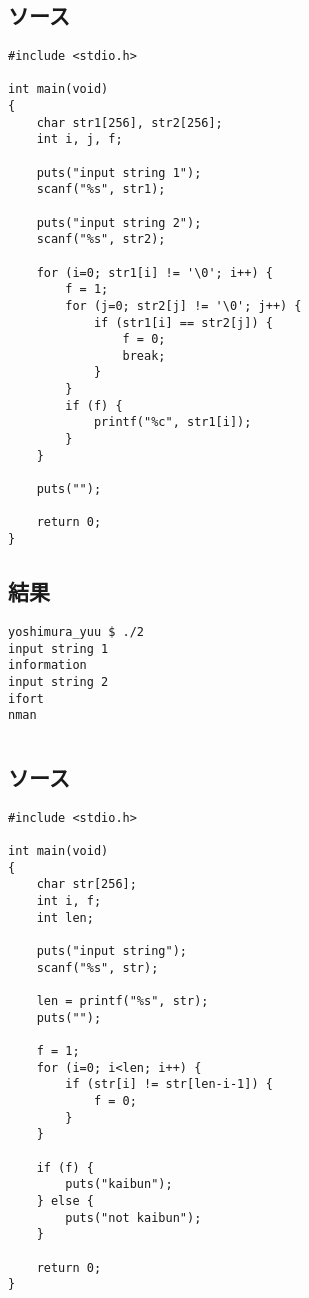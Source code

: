 \documentclass[11pt,a4paper,a4j]{jsarticle}
\begin{document}
\clearpage
\section{}
\subsection{ソース}
\begin{shadebox}
\begin{verbatim}
#include <stdio.h>

int main(void)
{
    char str1[256], str2[256];
    int i, j, f;

    puts("input string 1");
    scanf("%s", str1);

    puts("input string 2");
    scanf("%s", str2);
    
    for (i=0; str1[i] != '\0'; i++) {
        f = 1;
        for (j=0; str2[j] != '\0'; j++) {
            if (str1[i] == str2[j]) {
                f = 0;
                break;
            }
        }
        if (f) {
            printf("%c", str1[i]);
        }
    }

    puts("");

    return 0;
}
\end{verbatim}
\end{shadebox}

\subsection{結果}
\begin{shadebox}
\begin{verbatim}
yoshimura_yuu $ ./2
input string 1
information
input string 2
ifort
nman
\end{verbatim}
\end{shadebox}
\clearpage

\section{}
\subsection{ソース}
\begin{shadebox}
\begin{verbatim}
#include <stdio.h>

int main(void)
{
    char str[256];
    int i, f;
    int len;

    puts("input string");
    scanf("%s", str);

    len = printf("%s", str);
    puts("");

    f = 1;
    for (i=0; i<len; i++) {
        if (str[i] != str[len-i-1]) {
            f = 0;
        }
    }

    if (f) {
        puts("kaibun");
    } else {
        puts("not kaibun");
    }

    return 0;
}
\end{verbatim}
\end{shadebox}
\end{document}
